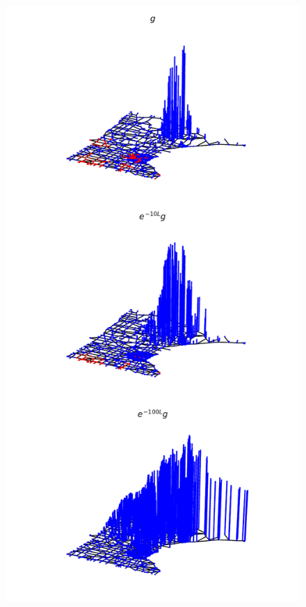 \documentclass{beamer}
\begin{document}
\begin{frame}
\begin{columns}
    \begin{column}{0.5\textwidth}
\begin{figure}
\includegraphics[trim={0 0 0 20cm},clip,width=0.9\linewidth]{../img/basic_operations_4.pdf}
\end{figure}
  \end{column}
  \end{columns}
\end{frame}
\end{document}
